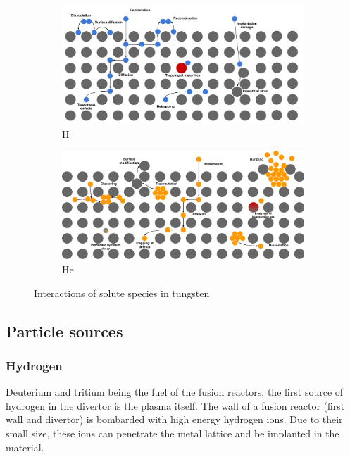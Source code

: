 \begin{figure}[h!]
    \begin{subfigure}{0.9\linewidth}
        \includegraphics[width=\linewidth]{Figures/Chapter1/HI transport sketch.pdf}
        \caption{H}
    \end{subfigure}
    \begin{subfigure}{0.9\linewidth}
        \includegraphics[width=\linewidth]{Figures/Chapter1/He transport sketch.pdf}
        \caption{He}
    \end{subfigure}
    \caption{Interactions of solute species in tungsten}
    \label{fig: helium and hydrogen in metals sketch}
\end{figure}

\subsection{Particle sources}

\subsubsection{Hydrogen}
Deuterium and tritium being the fuel of the fusion reactors, the first source of hydrogen in the divertor is the plasma itself.
The wall of a fusion reactor (first wall and divertor) is bombarded with high energy hydrogen ions.
Due to their small size, these ions can penetrate the metal lattice and be implanted in the material.


